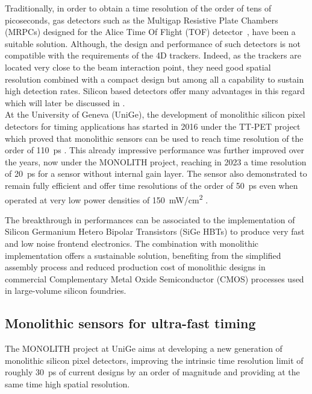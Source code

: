 Traditionally, in order to obtain a time resolution of the order of tens of picoseconds, gas detectors such as the Multigap Resistive Plate Chambers (MRPCs) designed for the Alice Time Of Flight (TOF) detector\ \cite{MRPCs_AliceTOF}, have been a suitable solution. Although, the design and performance of such detectors is not compatible with the requirements of the 4D trackers. Indeed, as the trackers are located very close to the beam interaction point, they need good spatial resolution combined with a compact design but among all a capability to sustain high detection rates. Silicon based detectors offer many advantages in this regard which will later be discussed in . \\

At the University of Geneva (UniGe), the development of monolithic silicon pixel detectors for timing applications has started in 2016 under the TT-PET project which proved that monolithic sensors can be used to reach time resolution of the order of \SI{110}{\pico\second} \cite{TTPET-110ps}. This already impressive performance was further improved over the years, now under the MONOLITH project, reaching in 2023 a time resolution of \SI{20}{\pico\second} for a sensor without internal gain layer. The sensor also demonstrated to remain fully efficient and offer time resolutions of the order of \SI{50}{\pico\second} even when operated at very low power densities of \SI{150}{\milli\watt/\centi\meter^2} \cite{Monolith_20ps}.

The breakthrough in performances can be associated to the implementation of Silicon Germanium Hetero Bipolar Transistors (SiGe HBTs) to produce very fast and low noise frontend electronics. The combination with monolithic implementation offers a sustainable solution, benefiting from the simplified assembly process and reduced production cost of monolithic designs in commercial Complementary Metal Oxide Semiconductor (CMOS) processes used in large-volume silicon foundries.

\subsection{Monolithic sensors for ultra-fast timing}
The MONOLITH project at UniGe aims at developing a new generation of monolithic silicon pixel detectors, improving the intrinsic time resolution limit of roughly \SI{30}{\pico\second} of current designs by an order of magnitude and providing at the same time high spatial resolution. 

